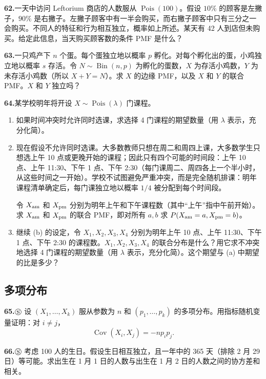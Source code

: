 \documentclass[UTF8, 12pt, fontset=fandol, oneside]{ctexart}
\begin{document}
\noindent\textbf{62.}\quad 一天中访问 Leftorium 商店的人数服从 $\operatorname{Pois}(100)$。假设 $10\%$ 的顾客是左撇子，$90\%$ 是右撇子。左撇子顾客中有一半会购买，而右撇子顾客中只有三分之一会购买。不同人的特征和行为相互独立，概率如上所述。某天有 42 人到店但未购买。给定此信息，当天购买顾客数的条件 PMF 是什么？

\noindent\textbf{63.}\quad 一只鸡产下 $n$ 个蛋。每个蛋独立地以概率 $p$ 孵化。对每个孵化出的蛋，小鸡独立地以概率 $s$ 存活。令 $N\sim \operatorname{Bin}(n,p)$ 为孵化的蛋数，$X$ 为存活小鸡数，$Y$ 为未存活小鸡数（所以 $X+Y=N$）。求 $X$ 的边缘 PMF，以及 $X$ 和 $Y$ 的联合 PMF。$X$ 和 $Y$ 独立吗？

\noindent\textbf{64.}\quad 某学校明年将开设 $X\sim \operatorname{Pois}(\lambda)$ 门课程。
\begin{enumerate}
  \item[(a)] 如果时间冲突时允许同时选课，求选择 4 门课程的期望数量（用 $\lambda$ 表示，充分化简）。
  \item[(b)] 现在假设不允许同时选课。大多数教师只想在周二和周四上课，大多数学生只想选上午 10 点或更晚开始的课程；因此只有四个可能的时间段：上午 10 点、上午 11:30、下午 1 点、下午 2:30（每门课周二、周四各上一个半小时，从这些时间之一开始）。学校不试图避免严重冲突，而是完全随机排课：明年课程清单确定后，每门课独立地以概率 $1/4$ 被分配到每个时间段。

  令 $X_{\rm am}$ 和 $X_{\rm pm}$ 分别为明年上午和下午课程数（其中“上午”指中午前开始）。求 $X_{\rm am}$ 和 $X_{\rm pm}$ 的联合 PMF，即对所有 $a,b$ 求 $P(X_{\rm am}=a,X_{\rm pm}=b)$。
  \item[(c)] 继续 (b) 的设定，令 $X_1,X_2,X_3,X_4$ 分别为明年上午 10 点、上午 11:30、下午 1 点、下午 2:30 的课程数。$X_1,X_2,X_3,X_4$ 的联合分布是什么？用它求不冲突地选择 4 门课程的期望数量（用 $\lambda$ 表示，充分化简）。这个期望与 (a) 中期望的比是多少？
\end{enumerate}

\subsection*{多项分布}

\noindent\textbf{65.}\quad $\circledS$ 设 $(X_1,\ldots,X_k)$ 服从参数为 $n$ 和 $(p_1,\ldots,p_k)$ 的多项分布。用指标随机变量证明：对 $i\ne j$，
\[
  \operatorname{Cov}(X_i,X_j)=-np_ip_j.
\]

\noindent\textbf{66.}\quad $\circledS$ 考虑 100 人的生日。假设生日相互独立，且一年中的 365 天（排除 2 月 29 日）等可能。求出生在 1 月 1 日的人数与出生在 1 月 2 日的人数之间的协方差和相关。
\end{document}
